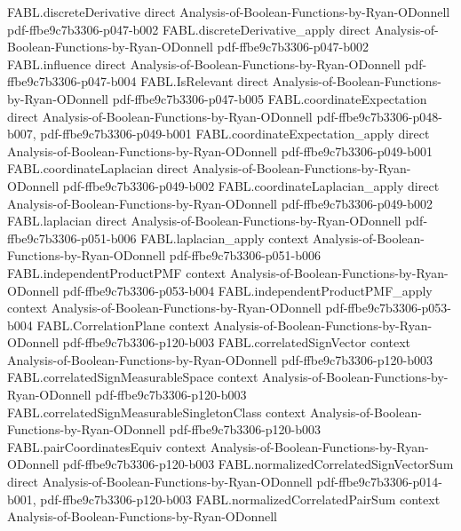 \begin{theorem}
\proofstep
  {FABL.discreteDerivative}
  {direct}
  {Analysis-of-Boolean-Functions-by-Ryan-ODonnell}
  {pdf-ffbe9c7b3306-p047-b002}
\proofstep
  {FABL.discreteDerivative_apply}
  {direct}
  {Analysis-of-Boolean-Functions-by-Ryan-ODonnell}
  {pdf-ffbe9c7b3306-p047-b002}
\proofstep
  {FABL.influence}
  {direct}
  {Analysis-of-Boolean-Functions-by-Ryan-ODonnell}
  {pdf-ffbe9c7b3306-p047-b004}
\proofstep
  {FABL.IsRelevant}
  {direct}
  {Analysis-of-Boolean-Functions-by-Ryan-ODonnell}
  {pdf-ffbe9c7b3306-p047-b005}
\proofstep
  {FABL.coordinateExpectation}
  {direct}
  {Analysis-of-Boolean-Functions-by-Ryan-ODonnell}
  {pdf-ffbe9c7b3306-p048-b007,
    pdf-ffbe9c7b3306-p049-b001}
\proofstep
  {FABL.coordinateExpectation_apply}
  {direct}
  {Analysis-of-Boolean-Functions-by-Ryan-ODonnell}
  {pdf-ffbe9c7b3306-p049-b001}
\proofstep
  {FABL.coordinateLaplacian}
  {direct}
  {Analysis-of-Boolean-Functions-by-Ryan-ODonnell}
  {pdf-ffbe9c7b3306-p049-b002}
\proofstep
  {FABL.coordinateLaplacian_apply}
  {direct}
  {Analysis-of-Boolean-Functions-by-Ryan-ODonnell}
  {pdf-ffbe9c7b3306-p049-b002}
\proofstep
  {FABL.laplacian}
  {direct}
  {Analysis-of-Boolean-Functions-by-Ryan-ODonnell}
  {pdf-ffbe9c7b3306-p051-b006}
\proofstep
  {FABL.laplacian_apply}
  {context}
  {Analysis-of-Boolean-Functions-by-Ryan-ODonnell}
  {pdf-ffbe9c7b3306-p051-b006}
\proofstep
  {FABL.independentProductPMF}
  {context}
  {Analysis-of-Boolean-Functions-by-Ryan-ODonnell}
  {pdf-ffbe9c7b3306-p053-b004}
\proofstep
  {FABL.independentProductPMF_apply}
  {context}
  {Analysis-of-Boolean-Functions-by-Ryan-ODonnell}
  {pdf-ffbe9c7b3306-p053-b004}
\proofstep
  {FABL.CorrelationPlane}
  {context}
  {Analysis-of-Boolean-Functions-by-Ryan-ODonnell}
  {pdf-ffbe9c7b3306-p120-b003}
\proofstep
  {FABL.correlatedSignVector}
  {context}
  {Analysis-of-Boolean-Functions-by-Ryan-ODonnell}
  {pdf-ffbe9c7b3306-p120-b003}
\proofstep
  {FABL.correlatedSignMeasurableSpace}
  {context}
  {Analysis-of-Boolean-Functions-by-Ryan-ODonnell}
  {pdf-ffbe9c7b3306-p120-b003}
\proofstep
  {FABL.correlatedSignMeasurableSingletonClass}
  {context}
  {Analysis-of-Boolean-Functions-by-Ryan-ODonnell}
  {pdf-ffbe9c7b3306-p120-b003}
\proofstep
  {FABL.pairCoordinatesEquiv}
  {context}
  {Analysis-of-Boolean-Functions-by-Ryan-ODonnell}
  {pdf-ffbe9c7b3306-p120-b003}
\proofstep
  {FABL.normalizedCorrelatedSignVectorSum}
  {direct}
  {Analysis-of-Boolean-Functions-by-Ryan-ODonnell}
  {pdf-ffbe9c7b3306-p014-b001,
    pdf-ffbe9c7b3306-p120-b003}
\proofstep
  {FABL.normalizedCorrelatedPairSum}
  {context}
  {Analysis-of-Boolean-Functions-by-Ryan-ODonnell}

\end{theorem}
